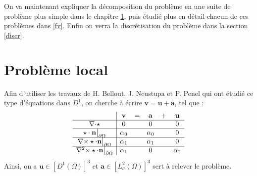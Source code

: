 On va maintenant expliquer la décomposition du problème en une suite de problème plus simple dans le chapitre \ref{local}, puis étudié plus en détail chacun de ces problèmes dans \ref{fv}. Enfin on verra la discrétisation du problème dans la section \ref{discr}.

\section{Problème local}
\label{local}

Afin d'utiliser les travaux de H. Bellout, J. Neustupa et P. Penel \cite{Penel2004} qui ont étudié ce type d'équations dans $D^1$, on cherche à écrire $\mathbf{v}=\mathbf{u}+\mathbf{a}$, tel que :\\
\begin{equation}\label{v}
\begin{array}{c|ccccc}
& \mathbf{v} & = & \mathbf{a} & + & \mathbf{u}\\ \hline
{\nabla\cdot}\star & 0 & & 0 & & 0\\ \hline
\star\cdot \mathbf{n}{\big\rvert_{\partial\Omega}} & \alpha_0 & & \alpha_0 & & 0\\ \hline
{\nabla\times}\star\cdot \mathbf{n}{\big\rvert_{\partial\Omega}} & \alpha_1 & & \alpha_1 & & 0\\ \hline
{\nabla^2\times}\star\cdot \mathbf{n}{\big\rvert_{\partial\Omega}} & \alpha_1 & & 0 & & \alpha_2
\end{array}
\end{equation}
Ainsi, on a $\mathbf{u}\in [D^1(\Omega)]^3$ et $\mathbf{a}\in [L_\sigma^2(\Omega)]^3$ sert à relever le problème.

